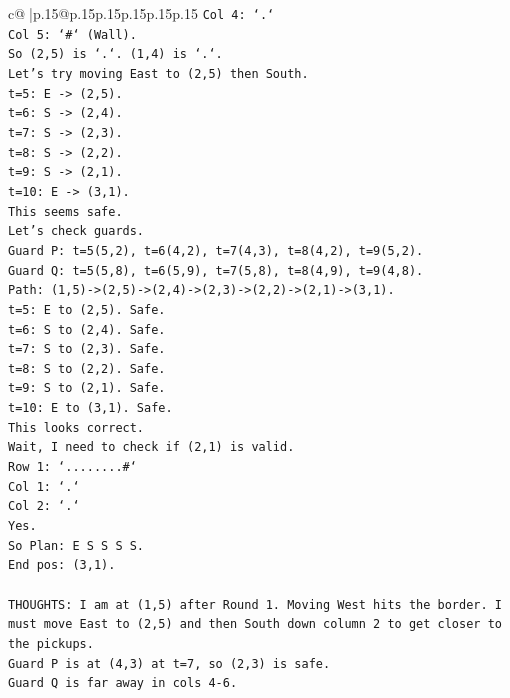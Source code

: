 \documentclass{article}
\begin{document}
{\begin{supertabular}{c@{$\;$}|p{.15\linewidth}@{}p{.15\linewidth}p{.15\linewidth}p{.15\linewidth}p{.15\linewidth}p{.15\linewidth}}
{{{\texttt{Col 4: `.`} \\
\texttt{Col 5: `\#` (Wall).} \\
\texttt{So (2,5) is `.`. (1,4) is `.`.} \\
\texttt{Let's try moving East to (2,5) then South.} \\
\texttt{t=5: E {-}> (2,5).} \\
\texttt{t=6: S {-}> (2,4).} \\
\texttt{t=7: S {-}> (2,3).} \\
\texttt{t=8: S {-}> (2,2).} \\
\texttt{t=9: S {-}> (2,1).} \\
\texttt{t=10: E {-}> (3,1).} \\
\texttt{This seems safe.} \\
\texttt{Let's check guards.} \\
\texttt{Guard P: t=5(5,2), t=6(4,2), t=7(4,3), t=8(4,2), t=9(5,2).} \\
\texttt{Guard Q: t=5(5,8), t=6(5,9), t=7(5,8), t=8(4,9), t=9(4,8).} \\
\texttt{Path: (1,5){-}>(2,5){-}>(2,4){-}>(2,3){-}>(2,2){-}>(2,1){-}>(3,1).} \\
\texttt{t=5: E to (2,5). Safe.} \\
\texttt{t=6: S to (2,4). Safe.} \\
\texttt{t=7: S to (2,3). Safe.} \\
\texttt{t=8: S to (2,2). Safe.} \\
\texttt{t=9: S to (2,1). Safe.} \\
\texttt{t=10: E to (3,1). Safe.} \\
\texttt{This looks correct.} \\
\texttt{Wait, I need to check if (2,1) is valid.} \\
\texttt{Row 1: `........\#`} \\
\texttt{Col 1: `.`} \\
\texttt{Col 2: `.`} \\
\texttt{Yes.} \\
\texttt{So Plan: E S S S S.} \\
\texttt{End pos: (3,1).} \\
\\ 
\texttt{THOUGHTS: I am at (1,5) after Round 1. Moving West hits the border. I must move East to (2,5) and then South down column 2 to get closer to the pickups.} \\
\texttt{Guard P is at (4,3) at t=7, so (2,3) is safe.} \\
\texttt{Guard Q is far away in cols 4{-}6.} \\
}}}
\end{supertabular}}
\end{document}

